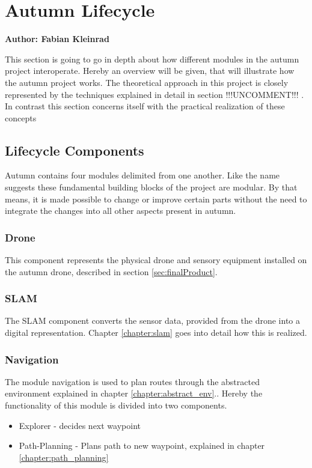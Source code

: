 \section{Autumn Lifecycle}
\textbf{Author: Fabian Kleinrad} 

This section is going to go in depth about how different modules in the autumn project interoperate. Hereby an overview will be given, that will illustrate how the autumn project works. The theoretical approach in this project is closely represented by the techniques explained in detail in section 
!!!UNCOMMENT!!!%
. In contrast this section concerns itself with the practical realization of these concepts

\subsection{Lifecycle Components}

Autumn contains four modules delimited from one another. Like the name suggests these fundamental building blocks of the project are modular. By that means, it is made possible to change or improve certain parts without the need to integrate the changes into all other aspects present in autumn.

\subsubsection{Drone} This component represents the physical drone and sensory equipment installed on the autumn drone, described in section \ref{sec:finalProduct}.  
\subsubsection{SLAM} The SLAM component converts the sensor data, provided from the drone into a digital representation. Chapter \ref{chapter:slam} goes into detail how this is realized.
\subsubsection{Navigation} The module navigation is used to plan routes through the abstracted environment explained in chapter \ref{chapter:abstract_env}.. Hereby the functionality of this module is divided into two components.
	\begin{itemize}
		\item Explorer - decides next waypoint
		\item Path-Planning - Plans path to new waypoint, explained in chapter \ref{chapter:path_planning}
	\end{itemize}
